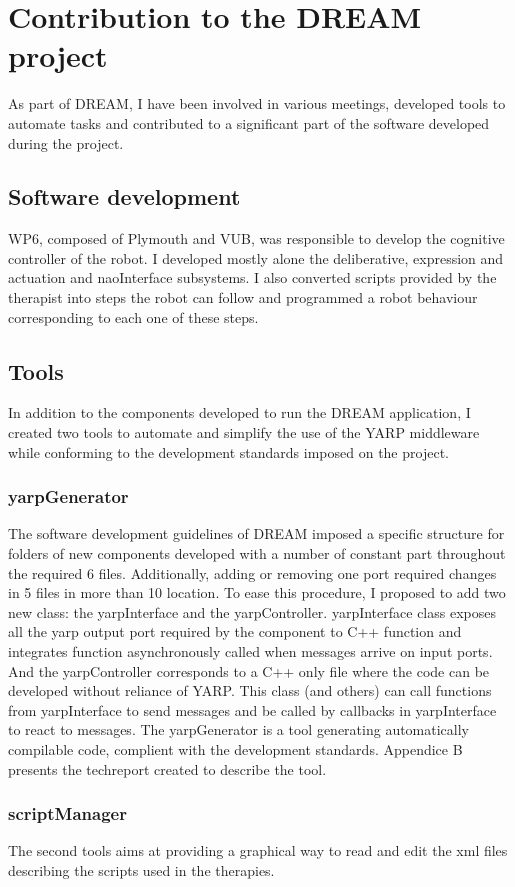 \chapter{Contribution to the DREAM project} \label{app:dream}

As part of DREAM, I have been involved in various meetings, developed tools to automate tasks and contributed to a significant part of the software developed during the project.

\section{Software development}

WP6, composed of Plymouth and VUB, was responsible to develop the cognitive controller of the robot. I developed mostly alone the deliberative, expression and actuation and naoInterface subsystems. I also converted scripts provided by the therapist into steps the robot can follow and programmed a robot behaviour corresponding to each one of these steps.


\section{Tools}

In addition to the components developed to run the DREAM application, I created two tools to automate and simplify the use of the YARP middleware while conforming to the development standards imposed on the project.

\subsection{yarpGenerator}

The software development guidelines of DREAM imposed a specific structure for folders of new components developed with a number of constant part throughout the required 6 files. Additionally, adding or removing one port required changes in 5 files in more than 10 location. To ease this procedure, I proposed to add two new class: the yarpInterface and the yarpController. yarpInterface class exposes all the yarp output port required by the component to C++ function and integrates function asynchronously called when messages arrive on input ports. And the yarpController corresponds to a C++ only file where the code can be developed without reliance of YARP. This class (and others) can call functions from yarpInterface to send messages and be called by callbacks in yarpInterface to react to messages. The yarpGenerator is a tool generating automatically compilable code, complient with the development standards. Appendice B presents the techreport created to describe the tool.

\subsection{scriptManager}

The second tools aims at providing a graphical way to read and edit the xml files describing the scripts used in the therapies.